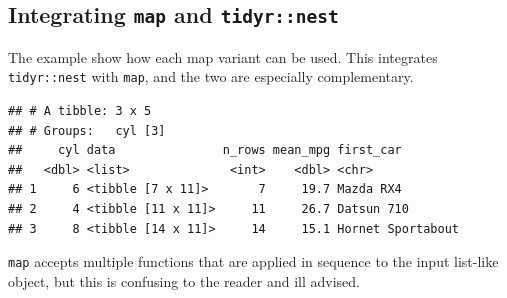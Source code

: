 \documentclass[]{book}
\newenvironment{Shaded}{}{}
\newcommand{\CommentTok}[1]{\textcolor[rgb]{0.38,0.63,0.69}{\textit{#1}}}
\newcommand{\DataTypeTok}[1]{\textcolor[rgb]{0.56,0.13,0.00}{#1}}
\newcommand{\KeywordTok}[1]{\textcolor[rgb]{0.00,0.44,0.13}{\textbf{#1}}}
\newcommand{\NormalTok}[1]{#1}
\newcommand{\OperatorTok}[1]{\textcolor[rgb]{0.40,0.40,0.40}{#1}}
\newcommand{\StringTok}[1]{\textcolor[rgb]{0.25,0.44,0.63}{#1}}
\begin{document}
\hypertarget{integrating-map-and-tidyrnest}{%
\subsection*{\texorpdfstring{Integrating \texttt{map} and \texttt{tidyr::nest}}{Integrating map and tidyr::nest}}\label{integrating-map-and-tidyrnest}}

The example show how each map variant can be used. This integrates \texttt{tidyr::nest} with \texttt{map}, and the two are especially complementary.

\begin{Shaded}
\end{Shaded}

\begin{verbatim}
## # A tibble: 3 x 5
## # Groups:   cyl [3]
##     cyl data               n_rows mean_mpg first_car        
##   <dbl> <list>              <int>    <dbl> <chr>            
## 1     6 <tibble [7 x 11]>       7     19.7 Mazda RX4        
## 2     4 <tibble [11 x 11]>     11     26.7 Datsun 710       
## 3     8 <tibble [14 x 11]>     14     15.1 Hornet Sportabout
\end{verbatim}

\texttt{map} accepts multiple functions that are applied in sequence to the input list-like object, but this is confusing to the reader and ill advised.
\end{document}

